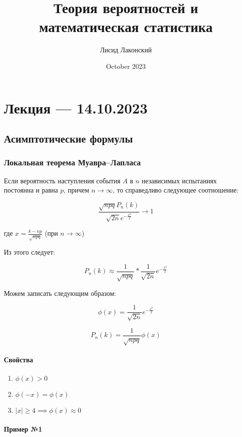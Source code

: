 \documentclass{article}
\title{Теория вероятностей и математическая статистика}
\author{Лисид Лаконский}
\date{October 2023}
\begin{document}
\raggedright

\maketitle

\tableofcontents
\pagebreak

\section{Лекция — 14.10.2023}

\subsection{Асимптотические формулы}

\subsubsection{Локальная теорема Муавра–Лапласа}

Если вероятность наступления события $A$ в $n$ независимых испытаниях постоянна и равна $p$, причем $n \rightarrow \infty$, то справедливо следующее соотношение:

$$
\frac{\sqrt{n p q} P_n (k)}{\sqrt{2 n} e^{-\frac{x^2}{2}}} \rightarrow 1
$$

где $x = \frac{k - n p}{\sqrt{n p q}}$ (при $n \to \infty$)

Из этого следует:

$$
P_{n}(k) \approx \frac{1}{\sqrt{n p q}} * \frac{1}{\sqrt{2 n}} e^{-\frac{x^2}{2}}
$$

Можем записать следующим образом:

$$\phi(x) = \frac{1}{\sqrt{2 n}} e^{-\frac{x^2}{2}}$$

$$P_n(k) = \frac{1}{\sqrt{npq}} \phi(x)$$

\paragraph{Свойства}

\begin{enumerate}
    \item $\phi(x) > 0$
    \item $\phi(-x) = \phi(x)$
    \item $|x| \ge 4 \implies \phi(x) \approx 0$
\end{enumerate}

\paragraph{Пример №1}
\end{document}

